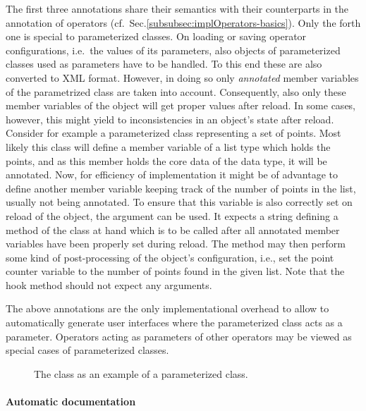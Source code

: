 The first three annotations share their semantics with their counterparts in the
 annotation of operators
(cf.~Sec.\ref{subsubsec:implOperators-basics}).
Only the forth one is special to parameterized classes. On loading or saving
operator configurations, i.e.~the values of its parameters, also objects of
parameterized classes used as parameters have to be handled. To this end these
are also converted to XML format. However, in doing so only {\em annotated}
member variables of the parametrized class are taken into account. Consequently,
also only these member variables of the object will get proper values after
reload.
In some cases, however, this might yield to inconsistencies in an object's state
after reload. Consider for example a parameterized class representing a set of
points. Most likely this class will define a member variable of a list type
which holds the points, and as this member holds the core data of the data
type, it will be annotated.
Now, for efficiency of implementation it might be of advantage to define another
member variable keeping track of the number of points in the list, usually not
being annotated. To ensure that this variable is also correctly set on reload of
the object, the  argument can be used. It expects a
string defining a method of the class at hand which is to be called after all
annotated member variables have been properly set during reload. The method may
then perform some kind of post-processing of the object's configuration, i.e.,
set the point counter variable to the number of points found in the given list.
Note that the hook method should not expect any arguments.

The above annotations are
the only implementational overhead to allow \alida to automatically generate user interfaces where the parameterized class acts as a parameter.
Operators acting as parameters of other operators may be viewed as
special cases of parameterized classes.


\begin{figure}

\caption{\label{exa:parametrizedClass}The class  as an example of a parameterized class.}
\end{figure}

\paragraph{Automatic documentation}

